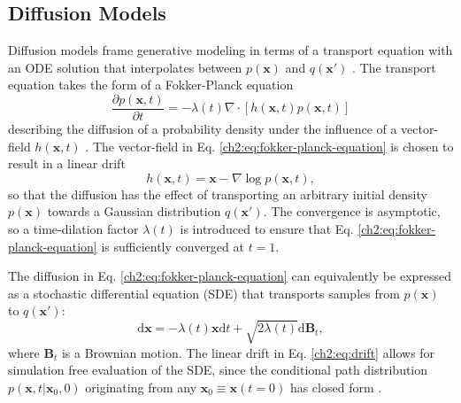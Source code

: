 \subsection{Diffusion Models}
\label{ch2:sec:sgm}
Diffusion models frame generative modeling in terms of a transport equation with an ODE solution that interpolates between $p(\mathbf{x})$ and $q(\mathbf{x}')$ \cite{nonequilibrium-learning,Ho2020DDPM,Song2021ScoreBased,FPE-probability-flow}. The transport equation takes the form of a Fokker-Planck equation
\begin{equation}
    \label{ch2:eq:fokker-planck-equation}
    \frac{\partial p(\mathbf{x},t)}{\partial t} = -\lambda(t) \nabla \cdot \left[h(\mathbf{x},t)p(\mathbf{x},t)\right]
\end{equation}
describing the diffusion of a probability density under the influence of a vector-field $h(\mathbf{x},t)$ \cite{FPE-probability-flow}. 
The vector-field in Eq. \ref{ch2:eq:fokker-planck-equation} is chosen to result in a linear drift
\begin{equation}
    \label{ch2:eq:drift}
    h(\mathbf{x},t) = \mathbf{x} - \nabla \log p(\mathbf{x},t),
\end{equation}
so that the diffusion has the effect of transporting an arbitrary initial density $p(\mathbf{x})$ towards a Gaussian distribution $q(\mathbf{x}')$. The convergence is asymptotic, so a time-dilation factor $\lambda(t)$ is introduced to ensure that Eq. \ref{ch2:eq:fokker-planck-equation} is sufficiently converged at $t=1$.

The diffusion in Eq. \ref{ch2:eq:fokker-planck-equation} can equivalently be expressed as a stochastic differential equation (SDE) that transports samples from $p(\mathbf{x})$ to $q(\mathbf{x}')$:
\begin{equation}
    \label{ch2:eq:sde-fwd}
    \mathrm{d}\mathbf{x} = -\lambda(t) \mathbf{x} \mathrm{d}t + \sqrt{2 \lambda(t)}\mathrm{d}\mathbf{B}_t,
\end{equation}
where $\mathbf{B}_t$ is a Brownian motion. The linear drift in Eq. \ref{ch2:eq:drift} allows for simulation free evaluation of the SDE, since the conditional path distribution $p(\mathbf{x},t | \mathbf{x}_0,0)$ originating from any $\mathbf{x}_0 \equiv \mathbf{x}(t=0)$ has closed form \cite{Song2021ScoreBased,nonequilibrium-learning}.


